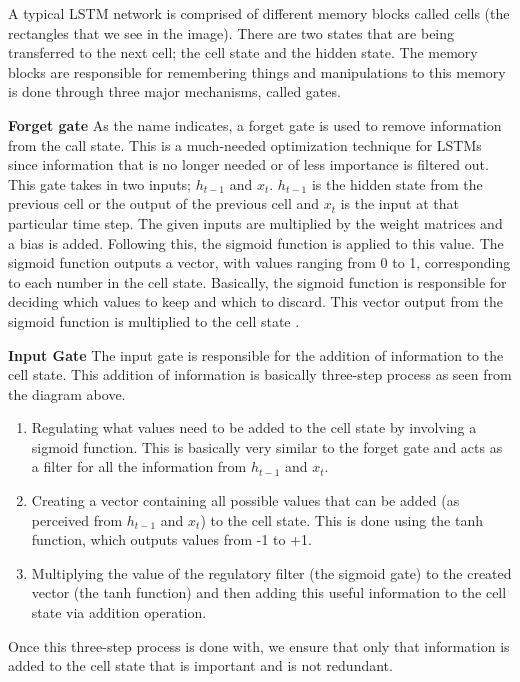  A typical LSTM network is comprised of different memory blocks called cells (the rectangles that we see in the image).  There are two states that are being transferred to the next cell; the cell state and the hidden state. The memory blocks are responsible for remembering things and manipulations to this memory is done through three major mechanisms, called gates.

\bigskip
\textbf{Forget gate}
As the name indicates, a forget gate is used to remove information from the call state. This is a much-needed optimization technique for LSTMs since information that is no longer needed or of less importance is filtered out.
This gate takes in two inputs; $h_{t-1}$ and $x_t$.
$h_{t-1}$ is the hidden state from the previous cell or the output of the previous cell and $x_t$ is the input at that particular time step. The given inputs are multiplied by the weight matrices and a bias is added. Following this, the sigmoid function is applied to this value. The sigmoid function outputs a vector, with values ranging from 0 to 1, corresponding to each number in the cell state. Basically, the sigmoid function is responsible for deciding which values to keep and which to discard. This vector output from the sigmoid function is multiplied to the cell state \cite{lewis2016deep}.

\bigskip
\textbf{Input Gate}
The input gate is responsible for the addition of information to the cell state. This addition of information is basically three-step process as seen from the diagram above.
\begin{enumerate}
    \item Regulating what values need to be added to the cell state by involving a sigmoid function. This is basically very similar to the forget gate and acts as a filter for all the information from $h_{t-1}$ and $x_{t}$.
    \item Creating a vector containing all possible values that can be added (as perceived from $h_{t-1}$ and $x_{t}$) to the cell state. This is done using the tanh function, which outputs values from -1 to +1.  
    \item Multiplying the value of the regulatory filter (the sigmoid gate) to the created vector (the tanh function) and then adding this useful information to the cell state via addition operation.
\end{enumerate}
Once this three-step process is done with, we ensure that only that information is added to the cell state that is important and is not redundant.

